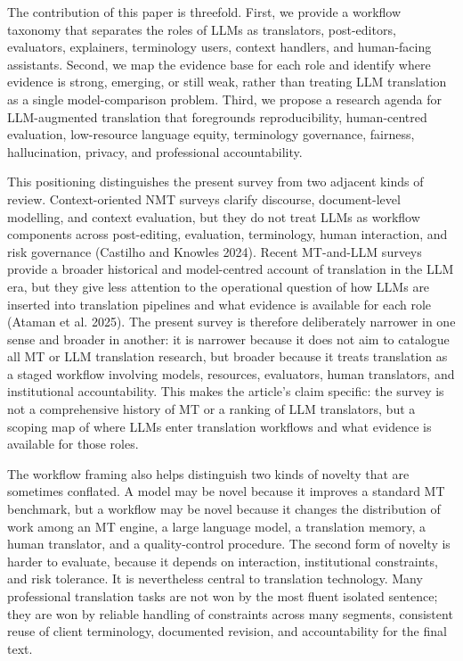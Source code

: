 \documentclass[11pt]{article}
\begin{document}
The contribution of this paper is threefold. First, we provide a workflow taxonomy that separates the roles of LLMs as translators, post-editors, evaluators, explainers, terminology users, context handlers, and human-facing assistants. Second, we map the evidence base for each role and identify where evidence is strong, emerging, or still weak, rather than treating LLM translation as a single model-comparison problem. Third, we propose a research agenda for LLM-augmented translation that foregrounds reproducibility, human-centred evaluation, low-resource language equity, terminology governance, fairness, hallucination, privacy, and professional accountability.

This positioning distinguishes the present survey from two adjacent kinds of review. Context-oriented NMT surveys clarify discourse, document-level modelling, and context evaluation, but they do not treat LLMs as workflow components across post-editing, evaluation, terminology, human interaction, and risk governance (Castilho and Knowles 2024). Recent MT-and-LLM surveys provide a broader historical and model-centred account of translation in the LLM era, but they give less attention to the operational question of how LLMs are inserted into translation pipelines and what evidence is available for each role (Ataman et al. 2025). The present survey is therefore deliberately narrower in one sense and broader in another: it is narrower because it does not aim to catalogue all MT or LLM translation research, but broader because it treats translation as a staged workflow involving models, resources, evaluators, human translators, and institutional accountability. This makes the article's claim specific: the survey is not a comprehensive history of MT or a ranking of LLM translators, but a scoping map of where LLMs enter translation workflows and what evidence is available for those roles.


The workflow framing also helps distinguish two kinds of novelty that are sometimes conflated. A model may be novel because it improves a standard MT benchmark, but a workflow may be novel because it changes the distribution of work among an MT engine, a large language model, a translation memory, a human translator, and a quality-control procedure. The second form of novelty is harder to evaluate, because it depends on interaction, institutional constraints, and risk tolerance. It is nevertheless central to translation technology. Many professional translation tasks are not won by the most fluent isolated sentence; they are won by reliable handling of constraints across many segments, consistent reuse of client terminology, documented revision, and accountability for the final text.
\end{document}
